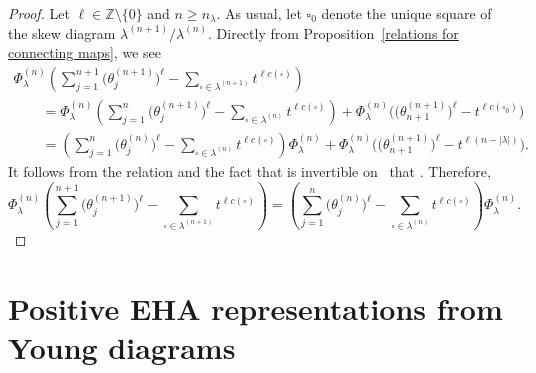 \documentclass[10pt,a4paper]{amsart}
\numberwithin{equation}{section}
\theoremstyle{definition}
\begin{document}
\begin{proof}
 Let $\ell \in \mathbb{Z}\setminus \{0\}$ and $n \geq n_{\lambda}$. As usual, let $\square_0$ denote the unique square of the skew diagram $\lambda^{(n+1)}/\lambda^{(n)}$. Directly from Proposition~\ref{relations for connecting maps}, we see
 \begin{gather*}
 \Phi^{(n)}_{\lambda}\left( \sum_{j=1}^{n+1}\bigl(\theta^{(n+1)}_j\bigr)^{\ell} - \sum_{\square \in \lambda^{(n+1)}} t^{\ell c(\square)} \right) \\
 \qquad = \Phi^{(n)}_{\lambda}\left( \sum_{j=1}^{n}\bigl(\theta^{(n+1)}_j\bigr)^{\ell} - \sum_{\square \in \lambda^{(n)}} t^{\ell c(\square)} \right) + \Phi^{(n)}_{\lambda}\bigl(\bigl(\theta^{(n+1)}_{n+1}\bigr)^{\ell} - t^{\ell c(\square_0)}\bigr) \\
 \qquad = \left( \sum_{j=1}^{n}\bigl(\theta^{(n)}_j\bigr)^{\ell} - \sum_{\square \in \lambda^{(n)}} t^{\ell c(\square)} \right)\Phi^{(n)}_{\lambda} + \Phi^{(n)}_{\lambda}\bigl(\bigl(\theta^{(n+1)}_{n+1}\bigr)^{\ell} - t^{\ell (n-|\lambda|)}\bigr).
 \end{gather*}
 It follows from the relation  and the fact that  is invertible on~ that
 .
 Therefore,
 \[
 \Phi^{(n)}_{\lambda}\left( \sum_{j=1}^{n+1}\bigl(\theta^{(n+1)}_j\bigr)^{\ell} - \sum_{\square \in \lambda^{(n+1)}} t^{\ell c(\square)} \right) =\left( \sum_{j=1}^{n}\bigl(\theta^{(n)}_j\bigr)^{\ell} - \sum_{\square \in \lambda^{(n)}} t^{\ell c(\square)} \right)\Phi^{(n)}_{\lambda}.\tag*{\qed}
 \]\renewcommand{\qed}{}
\end{proof}

\section{Positive EHA representations from Young diagrams}\label{Positive EHA Representations from Young Diagrams}
\end{document}
